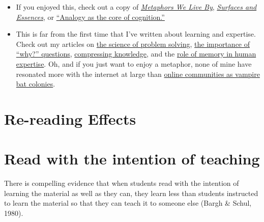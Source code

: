 \begin{itemize}
\itemsep1pt\parskip0pt
\item
  If you enjoyed this, check out a copy of
  \href{http://www.amazon.com/gp/product/0226468011/ref=as_li_tl?ie=UTF8\&camp=1789\&creative=390957\&creativeASIN=0226468011\&linkCode=as2\&tag=rsio-20}{\emph{Metaphors
  We Live By}},
  \href{http://www.amazon.com/gp/product/B00BE65086/ref=as_li_tl?ie=UTF8\&camp=1789\&creative=390957\&creativeASIN=B00BE65086\&linkCode=as2\&tag=rsio-20}{\emph{Surfaces
  and Essences}}, or
  \href{http://worrydream.com/refs/Hofstadter\%20-\%20Analogy\%20as\%20the\%20Core\%20of\%20Cognition.pdf}{``Analogy
  as the core of cognition.''}
\item
  This is far from the first time that I've written about learning and
  expertise. Check out my articles on
  \href{http://rs.io/2014/02/21/problem-solving.html}{the science of
  problem solving},
  \href{http://rs.io/2014/02/25/why-questions-reveal-structure.html}{the
  importance of ``why?'' questions},
  \href{http://rs.io/2014/02/24/compressing-knowledge.html}{compressing
  knowledge}, and the
  \href{http://rs.io/2014/01/20/human-expertise-and-memory-machines.html}{role
  of memory in human expertise}. Oh, and if you just want to enjoy a
  metaphor, none of mine have resonated more with the internet at large
  than
  \href{http://rs.io/2014/02/26/why-online-communities-decay-over-time.html}{online
  communities as vampire bat colonies}.
\end{itemize}


\section{Re-reading Effects}
\section{Read with the intention of teaching}
There is compelling evidence that when students read with the intention of learning the material as well as they can, they learn less than students instructed to learn the material so that they can teach it to someone else (Bargh & Schul, 1980).
